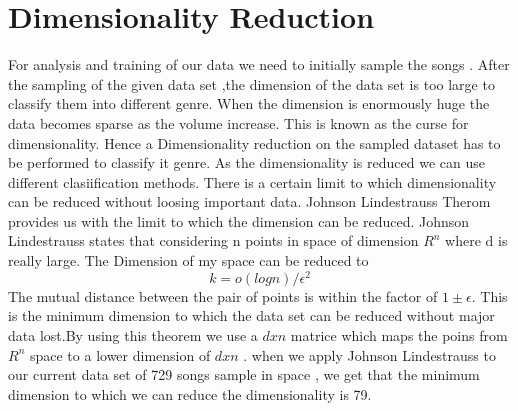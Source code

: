 \documentclass[12pt]{article}
\begin{document}
\section{Dimensionality Reduction}\label{dr}
For analysis and training of our data we need to initially sample the songs . After the sampling of the given data set  ,the dimension of the data set is too large to classify them into different genre. When the dimension is enormously huge the data becomes sparse as the volume increase. This is known as the curse for dimensionality. Hence a Dimensionality reduction on the sampled dataset has to be performed to classify it genre. As the dimensionality is reduced we can use different clasiification methods. There is a certain limit to which dimensionality can be reduced without loosing important data. Johnson Lindestrauss Therom provides us with the limit to which the dimension can be reduced.
Johnson Lindestrauss states that considering n points in space of dimension $R^n$  where d is really large. The Dimension of my space can be reduced to $$k=o(log n)/\epsilon^2$$
The mutual distance between the pair of points is within the factor of $1\pm \epsilon$. This is the minimum dimension to which the data set can be reduced without major data lost.By using this theorem we use a $dxn$ matrice which maps the poins from $R^n$ space to a lower dimension of $dxn$ .
when we apply Johnson Lindestrauss to our current data set of 729 songs sample in space , we get that the minimum dimension to which we can reduce the dimensionality is 79.
\end{document}
